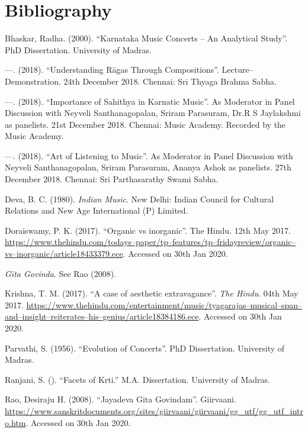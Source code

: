 \section*{Bibliography}

\begin{thebibliography}{99}
\itemsep=0pt
 Bhaskar, Radha. (2000). “Karnataka Music Concerts – An Analytical Study”. PhD Dissertation. University of Madras.

  —. (2018). “Understanding Rāgas Through Compositions”. Lecture–Demonstration. 24th December 2018. Chennai: Sri Thyaga Brahma Sabha.

  —. (2018). “Importance of Sahithya in Karnatic Music”. As Moderator in Panel Discussion with Neyveli Santhanagopalan, Sriram Parasuram, Dr.R S Jaylakshmi as panelists. 21st December 2018. Chennai: Music Academy. Recorded by the Music Academy.

  —. (2018). “Art of Listening to Music”. As Moderator in Panel Discussion with Neyveli Santhanagopalan, Sriram Parasuram, Ananya Ashok as panelists. 27th December 2018. Chennai: Sri Parthasarathy Swami Sabha.

  Deva, B. C. (1980). \textit{Indian Music}. New Delhi: Indian Council for Cultural Relations and New Age International (P) Limited.

  Doraiswamy, P. K. (2017). “Organic vs inorganic”. The Hindu. 12th May 2017. \url{https://www.thehindu.com/todays–paper/tp–features/tp–fridayreview/organic–vs–inorganic/article18433379.ece}. Accessed on 30th Jan 2020.

  \textit{Gīta Govinda}. See Rao (2008).

  Krishna, T. M. (2017). “A case of aesthetic extravagance”. \textit{The Hindu}. 04th May 2017. \url{https://www.thehindu.com/entertainment/music/tyagarajas–musical–span–and–insight–reiterates–his–genius/article18384186.ece}. Accessed on 30th Jan 2020.

  Parvathi, S. (1956). “Evolution of Concerts”. PhD Dissertation. University of Madras.

  Ranjani, S. (). “Facets of Krti.” M.A. Dissertation. University of Madras.

  Rao, Desiraju H. (2008). “Jayadeva Gita Govindam”. Giirvaani. \url{https://www.sanskritdocuments.org/sites/giirvaani/giirvaani/gg_utf/gg_utf_intro.htm}. Accessed on 30th Jan 2020.


\end{thebibliography}
